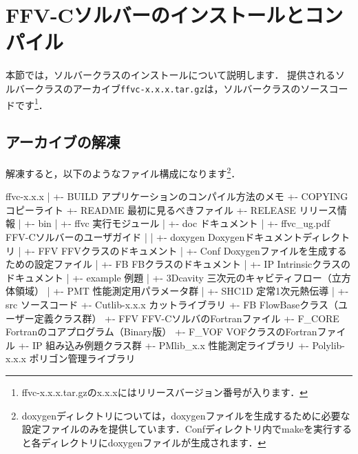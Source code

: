 \hypertarget{tgt:installFFV-C}{\section{FFV-Cソルバーのインストールとコンパイル}}

本節では，ソルバークラスのインストールについて説明します．
提供されるソルバークラスのアーカイブ\verb|ffvc-x.x.x.tar.gz|は，ソルバークラスのソースコードです\footnote{ffvc-x.x.x.tar.gzのx.x.xにはリリースバージョン番号が入ります．}．

\subsection{アーカイブの解凍}
{\small
{}
}

解凍すると，以下のようなファイル構成になります\footnote{doxygenディレクトリについては，doxygenファイルを生成するために必要な設定ファイルのみを提供しています．Confディレクトリ内でmakeを実行すると各ディレクトリにdoxygenファイルが生成されます．}．

{ \small
\begin{program}
ffvc-x.x.x
  |
  +- BUILD                        アプリケーションのコンパイル方法のメモ
  +- COPYING                      コピーライト
  +- README                       最初に見るべきファイル
  +- RELEASE                      リリース情報
  |
  +- bin                          
  |   +- ffvc                     実行モジュール
  |
  +- doc                          ドキュメント
  |   +- ffvc_ug.pdf              FFV-Cソルバーのユーザガイド
  |   
  |
  +- doxygen                      Doxygenドキュメントディレクトリ
  |   +- FFV                      FFVクラスのドキュメント
  |   +- Conf                     Doxygenファイルを生成するための設定ファイル
  |   +- FB                       FBクラスのドキュメント
  |   +- IP                       Intrinsicクラスのドキュメント
  |
  +- example                      例題
  |   +- 3Dcavity                 三次元のキャビティフロー（立方体領域）
  |   +- PMT                      性能測定用パラメータ群
  |   +- SHC1D                    定常1次元熱伝導
  |
  +- src                          ソースコード
      +- Cutlib-x.x.x             カットライブラリ
      +- FB                       FlowBaseクラス（ユーザー定義クラス群）
      +- FFV                      FFV-CソルバのFortranファイル
      +- F_CORE                   Fortranのコアプログラム（Binary版）
      +- F_VOF                    VOFクラスのFortranファイル
      +- IP                       組み込み例題クラス群
      +- PMlib_x.x	             性能測定ライブラリ
      +- Polylib-x.x.x             ポリゴン管理ライブラリ

\end{program}
}

